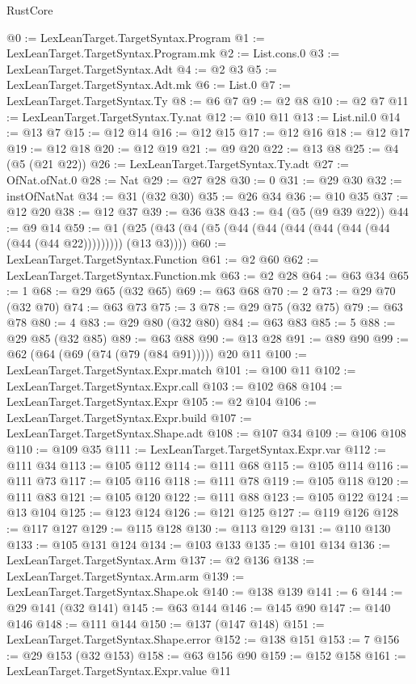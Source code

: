 \begin{lexlean}{RustCore}
\begin{coremodule}
{\begin{coremodule}
{{{{{{{{{{{{{{{{{{{{{{{{{{{{{{{{{{{{{{{{{{{{@0 := LexLeanTarget.TargetSyntax.Program
@1 := LexLeanTarget.TargetSyntax.Program.mk
@2 := List.cons.{0}
@3 := LexLeanTarget.TargetSyntax.Adt
@4 := @2 @3
@5 := LexLeanTarget.TargetSyntax.Adt.mk
@6 := List.{0}
@7 := LexLeanTarget.TargetSyntax.Ty
@8 := @6 @7
@9 := @2 @8
@10 := @2 @7
@11 := LexLeanTarget.TargetSyntax.Ty.nat
@12 := @10 @11
@13 := List.nil.{0}
@14 := @13 @7
@15 := @12 @14
@16 := @12 @15
@17 := @12 @16
@18 := @12 @17
@19 := @12 @18
@20 := @12 @19
@21 := @9 @20
@22 := @13 @8
@25 := @4 (@5 (@21 @22))
@26 := LexLeanTarget.TargetSyntax.Ty.adt
@27 := OfNat.ofNat.{0}
@28 := Nat
@29 := @27 @28
@30 := 0
@31 := @29 @30
@32 := instOfNatNat
@34 := @31 (@32 @30)
@35 := @26 @34
@36 := @10 @35
@37 := @12 @20
@38 := @12 @37
@39 := @36 @38
@43 := @4 (@5 (@9 @39 @22))
@44 := @9 @14
@59 := @1 (@25 (@43 (@4 (@5 (@44 (@44 (@44 (@44 (@44 (@44 (@44 (@44 @22))))))))) (@13 @3))))
@60 := LexLeanTarget.TargetSyntax.Function
@61 := @2 @60
@62 := LexLeanTarget.TargetSyntax.Function.mk
@63 := @2 @28
@64 := @63 @34
@65 := 1
@68 := @29 @65 (@32 @65)
@69 := @63 @68
@70 := 2
@73 := @29 @70 (@32 @70)
@74 := @63 @73
@75 := 3
@78 := @29 @75 (@32 @75)
@79 := @63 @78
@80 := 4
@83 := @29 @80 (@32 @80)
@84 := @63 @83
@85 := 5
@88 := @29 @85 (@32 @85)
@89 := @63 @88
@90 := @13 @28
@91 := @89 @90
@99 := @62 (@64 (@69 (@74 (@79 (@84 @91))))) @20 @11
@100 := LexLeanTarget.TargetSyntax.Expr.match
@101 := @100 @11
@102 := LexLeanTarget.TargetSyntax.Expr.call
@103 := @102 @68
@104 := LexLeanTarget.TargetSyntax.Expr
@105 := @2 @104
@106 := LexLeanTarget.TargetSyntax.Expr.build
@107 := LexLeanTarget.TargetSyntax.Shape.adt
@108 := @107 @34
@109 := @106 @108
@110 := @109 @35
@111 := LexLeanTarget.TargetSyntax.Expr.var
@112 := @111 @34
@113 := @105 @112
@114 := @111 @68
@115 := @105 @114
@116 := @111 @73
@117 := @105 @116
@118 := @111 @78
@119 := @105 @118
@120 := @111 @83
@121 := @105 @120
@122 := @111 @88
@123 := @105 @122
@124 := @13 @104
@125 := @123 @124
@126 := @121 @125
@127 := @119 @126
@128 := @117 @127
@129 := @115 @128
@130 := @113 @129
@131 := @110 @130
@133 := @105 @131 @124
@134 := @103 @133
@135 := @101 @134
@136 := LexLeanTarget.TargetSyntax.Arm
@137 := @2 @136
@138 := LexLeanTarget.TargetSyntax.Arm.arm
@139 := LexLeanTarget.TargetSyntax.Shape.ok
@140 := @138 @139
@141 := 6
@144 := @29 @141 (@32 @141)
@145 := @63 @144
@146 := @145 @90
@147 := @140 @146
@148 := @111 @144
@150 := @137 (@147 @148)
@151 := LexLeanTarget.TargetSyntax.Shape.error
@152 := @138 @151
@153 := 7
@156 := @29 @153 (@32 @153)
@158 := @63 @156 @90
@159 := @152 @158
@161 := LexLeanTarget.TargetSyntax.Expr.value @11
}}}}}}}}}}}}}}}}}}}}}}}}}}}}}}}}}}}}}}}}}}}}
\end{coremodule}}
\end{coremodule}
\end{lexlean}
